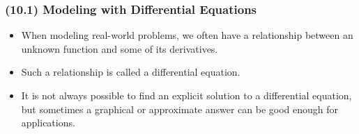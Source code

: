 \begin{frame}
\frametitle{(10.1) Modeling with Differential Equations}
\begin{itemize}
\item  When modeling real-world problems, we often have a relationship between an unknown function and some of its derivatives.  
\item  Such a relationship is called a differential equation.
\item  It is not always possible to find an explicit solution to a differential equation, but sometimes a graphical or approximate answer can be good enough for applications.
\end{itemize}
\end{frame}
